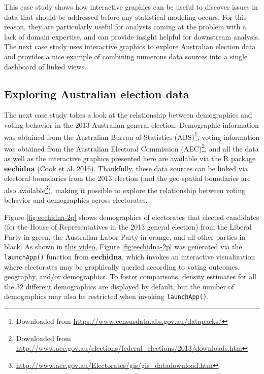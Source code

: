 \documentclass[12pt,]{isuthesis}
\let\rmarkdownfootnote\footnote%
\def\footnote{\protect\rmarkdownfootnote}
\begin{document}
This case study shows how interactive graphics can be useful to discover
issues in data that should be addressed before any statistical modeling
occurs. For this reason, they are particularly useful for analysts
coming at the problem with a lack of domain expertise, and can provide
insight helpful for downstream analysis. The next case study uses
interactive graphics to explore Australian election data and provides a
nice example of combining numerous data sources into a single dashboard
of linked views.

\hypertarget{exploring-australian-election-data}{\subsection{Exploring
Australian election data}\label{exploring-australian-election-data}}

The next case study takes a look at the relationship between
demographics and voting behavior in the 2013 Australian general
election. Demographic information was obtained from the Australian
Bureau of Statistics (ABS)\footnote{Downloaded from
  \url{https://www.censusdata.abs.gov.au/datapacks/}}, voting
information was obtained from the Australian Electoral Commission
(AEC)\footnote{Downloaded from
  \url{http://www.aec.gov.au/elections/federal_elections/2013/downloads.htm}},
and all the data as well as the interactive graphics presented here are
available via the R package \textbf{eechidna} (Cook et al.
\protect\hyperlink{ref-eechidna}{2016}). Thankfully, these data sources
can be linked via electoral boundaries from the 2013 election (and the
geo-spatial boundaries are also available\footnote{\url{http://www.aec.gov.au/Electorates/gis/gis_datadownload.htm}}),
making it possible to explore the relationship between voting behavior
and demographics across electorates.

Figure \ref{fig:eechidna-2p} shows demographics of electorates that
elected candidates (for the House of Representatives in the 2013 general
election) from the Liberal Party in green, the Australian Labor Party in
orange, and all other parties in black. As shown in
\href{https://vimeo.com/191553616}{this video}, Figure
\ref{fig:eechidna-2p} was generated via the \texttt{launchApp()}
function from \textbf{eechidna}, which invokes an interactive
visualization where electorates may be graphically queried according to
voting outcomes, geography, and/or demographics. To foster comparisons,
density estimates for all the 32 different demographics are displayed by
default, but the number of demographics may also be restricted when
invoking \texttt{launchApp()}.
\end{document}
